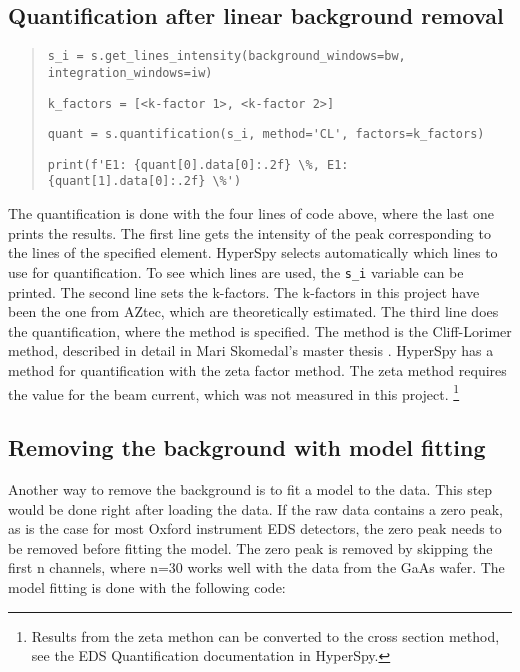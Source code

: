 \subsection{Quantification after linear background removal}
\label{sec:results:steps:quantification:linear}

\begin{quote}
    \verb|s_i = s.get_lines_intensity(background_windows=bw, integration_windows=iw)|

    \verb|k_factors = [<k-factor 1>, <k-factor 2>]  |

    \verb|quant = s.quantification(s_i, method='CL', factors=k_factors)|

    \verb|print(f'E1: {quant[0].data[0]:.2f} \%, E1: {quant[1].data[0]:.2f} \%')|
\end{quote}

The quantification is done with the four lines of code above, where the last one prints the results.
The first line gets the intensity of the peak corresponding to the lines of the specified element.
HyperSpy selects automatically which lines to use for quantification.
To see which lines are used, the \verb|s_i| variable can be printed.
The second line sets the k-factors.
The k-factors in this project have been the one from AZtec, which are theoretically estimated.
The third line does the quantification, where the method is specified.
The method is the Cliff-Lorimer method, described in detail in Mari Skomedal's master thesis \cite[Sec. 2.2.3]{skomedal_improving_2022}.
HyperSpy has a method for quantification with the zeta factor method.
The zeta method requires the value for the beam current, which was not measured in this project. \footnote{Results from the zeta methon can be converted to the cross section method, see the EDS Quantification documentation in HyperSpy.}



\subsection{Removing the background with model fitting}
\label{sec:results:steps:model_fitting}
Another way to remove the background is to fit a model to the data.
This step would be done right after loading the data.
If the raw data contains a zero peak, as is the case for most Oxford instrument EDS detectors, the zero peak needs to be removed before fitting the model.
The zero peak is removed by skipping the first n channels, where n=30 works well with the data from the GaAs wafer.
The model fitting is done with the following code:

